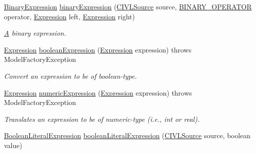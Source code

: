 \begin{DoxyCompactItemize}
\hyperlink{interfaceedu_1_1udel_1_1cis_1_1vsl_1_1civl_1_1model_1_1IF_1_1expression_1_1BinaryExpression}{Binary\+Expression} \hyperlink{classedu_1_1udel_1_1cis_1_1vsl_1_1civl_1_1model_1_1common_1_1CommonModelFactory_aca414fa4f413a33a5991036cabc474f8}{binary\+Expression} (\hyperlink{interfaceedu_1_1udel_1_1cis_1_1vsl_1_1civl_1_1model_1_1IF_1_1CIVLSource}{C\+I\+V\+L\+Source} source, \hyperlink{enumedu_1_1udel_1_1cis_1_1vsl_1_1civl_1_1model_1_1IF_1_1expression_1_1BinaryExpression_1_1BINARY__OPERATOR}{B\+I\+N\+A\+R\+Y\+\_\+\+O\+P\+E\+R\+A\+T\+O\+R} operator, \hyperlink{interfaceedu_1_1udel_1_1cis_1_1vsl_1_1civl_1_1model_1_1IF_1_1expression_1_1Expression}{Expression} left, \hyperlink{interfaceedu_1_1udel_1_1cis_1_1vsl_1_1civl_1_1model_1_1IF_1_1expression_1_1Expression}{Expression} right)
\begin{DoxyCompactList}\small\item\em \hyperlink{structA}{A} binary expression. \end{DoxyCompactList}\item 
\hyperlink{interfaceedu_1_1udel_1_1cis_1_1vsl_1_1civl_1_1model_1_1IF_1_1expression_1_1Expression}{Expression} \hyperlink{classedu_1_1udel_1_1cis_1_1vsl_1_1civl_1_1model_1_1common_1_1CommonModelFactory_ae9a816833fac873f341f60506b10b656}{boolean\+Expression} (\hyperlink{interfaceedu_1_1udel_1_1cis_1_1vsl_1_1civl_1_1model_1_1IF_1_1expression_1_1Expression}{Expression} expression)  throws Model\+Factory\+Exception 
\begin{DoxyCompactList}\small\item\em Convert an expression to be of boolean-\/type. \end{DoxyCompactList}\item 
\hyperlink{interfaceedu_1_1udel_1_1cis_1_1vsl_1_1civl_1_1model_1_1IF_1_1expression_1_1Expression}{Expression} \hyperlink{classedu_1_1udel_1_1cis_1_1vsl_1_1civl_1_1model_1_1common_1_1CommonModelFactory_aacbc2ad530350faa3432166d44ab2bad}{numeric\+Expression} (\hyperlink{interfaceedu_1_1udel_1_1cis_1_1vsl_1_1civl_1_1model_1_1IF_1_1expression_1_1Expression}{Expression} expression)  throws Model\+Factory\+Exception 
\begin{DoxyCompactList}\small\item\em Translates an expression to be of numeric-\/type (i.\+e., int or real). \end{DoxyCompactList}\item 
\hyperlink{interfaceedu_1_1udel_1_1cis_1_1vsl_1_1civl_1_1model_1_1IF_1_1expression_1_1BooleanLiteralExpression}{Boolean\+Literal\+Expression} \hyperlink{classedu_1_1udel_1_1cis_1_1vsl_1_1civl_1_1model_1_1common_1_1CommonModelFactory_a0747742c049b87f3f9af62ff2547f260}{boolean\+Literal\+Expression} (\hyperlink{interfaceedu_1_1udel_1_1cis_1_1vsl_1_1civl_1_1model_1_1IF_1_1CIVLSource}{C\+I\+V\+L\+Source} source, boolean value)

\end{DoxyCompactItemize}
